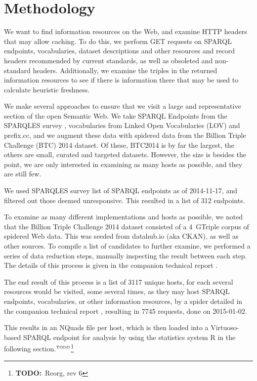 \documentclass{llncs}
\newcommand{\todo}[1]{\ensuremath{^{\textrm{\tiny{TODO}\normalsize}}}\footnote{\textbf{TODO:}~#1}}
\begin{document}
\section{Methodology}
We want to find information resources on the Web, and examine HTTP
headers that may allow caching. To do this, we perform GET requests on
SPARQL endpoints, vocabularies, dataset descriptions and other
resources and record headers recommended by current standards, as well
as obsoleted and non-standard headers. Additionally, we examine the
triples in the returned information resources to see if there is
information there that may be used to calculate heuristic freshness.

We make several approaches to ensure that we visit a large and
representative section of the open Semantic Web. We take SPARQL
Endpoints from the SPARQLES survey \cite{buil2013sparql}, vocabularies
from Linked Open Vocabularies (LOV) \cite{lov2} and prefix.cc, and we
augment these data with spidered data from the Billion Triple
Challenge (BTC) 2014 \cite{btc-2014} dataset. Of these, BTC2014 is by
far the largest, the others are small, curated and targeted
datasets. However, the size is besides the point, we are only
interested in examining as many hosts as possible, and they are still
few.

We used SPARQLES survey list of SPARQL endpoints as of 2014-11-17, and
filtered out those deemed unresponsive. This resulted in a
list of 312 endpoints.

To examine as many different implementations and hosts as possible, we
noted that the Billion Triple Challenge 2014 \cite{btc-2014} dataset
consisted of a 4~GTriple corpus of spidered Web data. This was seeded
from datahub.io (aka CKAN), as well as other sources. To compile a list of
candidates to further examine, we performed a series of data reduction
steps, manually inspecting the result between each step. The details
of this process is given in the companion technical report
\cite{kjernsmo_add_survey_2015}.%

The end result of this process is a list of 3117 unique hosts, for
each several resources would be visited, some several times, as they
may host SPARQL endpoints, vocabularies, or other information
resources, by a spider detailed in the companion technical report
\cite{kjernsmo_add_survey_2015}, resulting in 7745 requests, done on
2015-01-02. 

This results in an NQuads file per host, which is then loaded into a
Virtuoso-based SPARQL endpoint for analysis by using the statistics
system R\cite{kn:r} in the following section.\todo{Reorg, rev 6}
\end{document}
